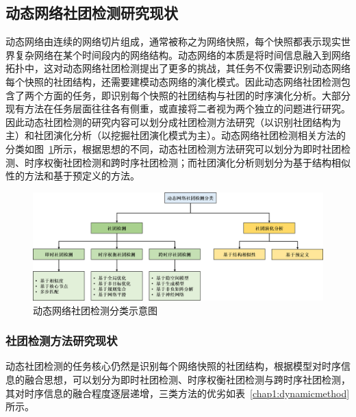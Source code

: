
\subsection{动态网络社团检测研究现状}

动态网络由连续的网络切片组成，通常被称之为网络快照，每个快照都表示现实世界复杂网络在某个时间段内的网络结构。动态网络的本质是将时间信息融入到网络拓扑中，这对动态网络社团检测提出了更多的挑战，其任务不仅需要识别动态网络每个快照的社团结构，还需要建模动态网络的演化模式。因此动态网络社团检测包含了两个方面的任务，即识别每个快照的社团结构与社团的时序演化分析\cite{rossetti2018community}。大部分现有方法在任务层面往往各有侧重，或直接将二者视为两个独立的问题进行研究。因此动态社团检测的研究内容可以划分成社团检测方法研究（以识别社团结构为主）和社团演化分析（以挖掘社团演化模式为主）\cite{rossetti2018community}。动态网络社团检测相关方法的分类如图~\ref{chap1:fig:dcdclasses}所示，根据思想的不同，动态社团检测方法研究可以划分为即时社团检测、时序权衡社团检测和跨时序社团检测；而社团演化分析则划分为基于结构相似性的方法和基于预定义的方法。
\begin{figure}
    \centering
    \includegraphics[width=\linewidth]{figures/chap01/classification of dcd.png}
    \caption{动态网络社团检测分类示意图}
    \label{chap1:fig:dcdclasses}
\end{figure}

\subsubsection{社团检测方法研究现状}

动态社团检测的任务核心仍然是识别每个网络快照的社团结构，根据模型对时序信息的融合思想，可以划分为即时社团检测、时序权衡社团检测与跨时序社团检测，其对时序信息的融合程度逐层递增，三类方法的优劣如表~\ref{chap1:dynamicmethod}所示。


